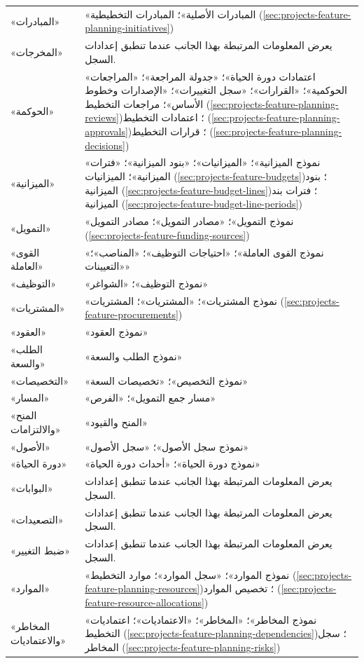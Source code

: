\begin{table}[H]
\begin{tabularx}{\linewidth}{R{4.2cm} Y}
«المبادرات» & «المبادرات الأصلية»؛ المبادرات التخطيطية (\ref{sec:projects-feature-planning-initiatives})\\
«المخرجات» & يعرض المعلومات المرتبطة بهذا الجانب عندما تنطبق إعدادات السجل.\\
«الحوكمة» & «اعتمادات دورة الحياة»؛ «جدولة المراجعة»؛ «المراجعات الحوكمية»؛ «القرارات»؛ «سجل التغييرات»؛ «الإصدارات وخطوط الأساس»؛ مراجعات التخطيط (\ref{sec:projects-feature-planning-reviews})؛ اعتمادات التخطيط (\ref{sec:projects-feature-planning-approvals})؛ قرارات التخطيط (\ref{sec:projects-feature-planning-decisions})\\
«الميزانية» & «نموذج الميزانية»؛ «الميزانيات»؛ «بنود الميزانية»؛ «فترات الميزانية»؛ الميزانيات (\ref{sec:projects-feature-budgets})؛ بنود الميزانية (\ref{sec:projects-feature-budget-lines})؛ فترات بند الميزانية (\ref{sec:projects-feature-budget-line-periods})\\
«التمويل» & «نموذج التمويل»؛ «مصادر التمويل»؛ مصادر التمويل (\ref{sec:projects-feature-funding-sources})\\
«القوى العاملة» & «نموذج القوى العاملة»؛ «احتياجات التوظيف»؛ «المناصب»؛ «التعيينات»\\
«التوظيف» & «نموذج التوظيف»؛ «الشواغر»\\
«المشتريات» & «نموذج المشتريات»؛ «المشتريات»؛ المشتريات (\ref{sec:projects-feature-procurements})\\
«العقود» & «نموذج العقود»\\
«الطلب والسعة» & «نموذج الطلب والسعة»\\
«التخصيصات» & «نموذج التخصيص»؛ «تخصيصات السعة»\\
«المسار» & «مسار جمع التمويل»؛ «الفرص»\\
«المنح والالتزامات» & «المنح والقيود»\\
«الأصول» & «نموذج سجل الأصول»؛ «سجل الأصول»\\
«دورة الحياة» & «نموذج دورة الحياة»؛ «أحداث دورة الحياة»\\
«البوابات» & يعرض المعلومات المرتبطة بهذا الجانب عندما تنطبق إعدادات السجل.\\
«التصعيدات» & يعرض المعلومات المرتبطة بهذا الجانب عندما تنطبق إعدادات السجل.\\
«ضبط التغيير» & يعرض المعلومات المرتبطة بهذا الجانب عندما تنطبق إعدادات السجل.\\
«الموارد» & «نموذج الموارد»؛ «سجل الموارد»؛ موارد التخطيط (\ref{sec:projects-feature-planning-resources})؛ تخصيص الموارد (\ref{sec:projects-feature-resource-allocations})\\
«المخاطر والاعتماديات» & «نموذج المخاطر»؛ «المخاطر»؛ «الاعتماديات»؛ اعتماديات التخطيط (\ref{sec:projects-feature-planning-dependencies})؛ سجل المخاطر (\ref{sec:projects-feature-planning-risks})\\

\end{tabularx}
\end{table}
